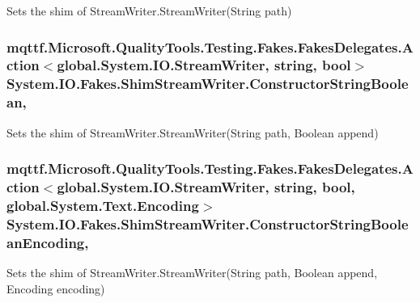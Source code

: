 Sets the shim of Stream\-Writer.\-Stream\-Writer(\-String path)

\hypertarget{class_system_1_1_i_o_1_1_fakes_1_1_shim_stream_writer_aae12a8fc3e5fff968b039bd1fcf32fab}{
\subsubsection[{Constructor\-String\-Boolean}]{\setlength{\rightskip}{0pt plus 5cm}mqttf.\-Microsoft.\-Quality\-Tools.\-Testing.\-Fakes.\-Fakes\-Delegates.\-Action$<$global.\-System.\-I\-O.\-Stream\-Writer, string, bool$>$ System.\-I\-O.\-Fakes.\-Shim\-Stream\-Writer.\-Constructor\-String\-Boolean\hspace{0.3cm}{\ttfamily [static]}, {\ttfamily [set]}}}\label{class_system_1_1_i_o_1_1_fakes_1_1_shim_stream_writer_aae12a8fc3e5fff968b039bd1fcf32fab}


Sets the shim of Stream\-Writer.\-Stream\-Writer(\-String path, Boolean append)

\hypertarget{class_system_1_1_i_o_1_1_fakes_1_1_shim_stream_writer_a4114f0981420cfdc98d654883685eabf}{
\subsubsection[{Constructor\-String\-Boolean\-Encoding}]{\setlength{\rightskip}{0pt plus 5cm}mqttf.\-Microsoft.\-Quality\-Tools.\-Testing.\-Fakes.\-Fakes\-Delegates.\-Action$<$global.\-System.\-I\-O.\-Stream\-Writer, string, bool, global.\-System.\-Text.\-Encoding$>$ System.\-I\-O.\-Fakes.\-Shim\-Stream\-Writer.\-Constructor\-String\-Boolean\-Encoding\hspace{0.3cm}{\ttfamily [static]}, {\ttfamily [set]}}}\label{class_system_1_1_i_o_1_1_fakes_1_1_shim_stream_writer_a4114f0981420cfdc98d654883685eabf}


Sets the shim of Stream\-Writer.\-Stream\-Writer(\-String path, Boolean append, Encoding encoding)

